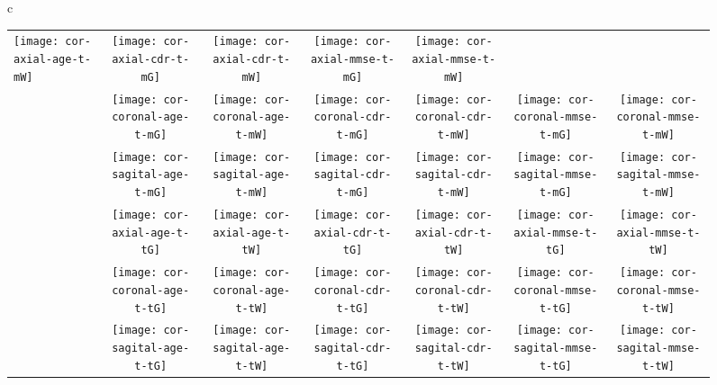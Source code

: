 \documentclass{llncs}
\begin{document}
\begin{figure}[tb]
\begin{tabular}{c}
\begin{tabular}{l|cc|cc|cc}
\texttt{[image: cor-axial-age-t-mW]} &
\texttt{[image: cor-axial-cdr-t-mG]} &
\texttt{[image: cor-axial-cdr-t-mW]} &
\texttt{[image: cor-axial-mmse-t-mG]} &
\texttt{[image: cor-axial-mmse-t-mW]} \\ 
%
        &
\texttt{[image: cor-coronal-age-t-mG]} &
\texttt{[image: cor-coronal-age-t-mW]} &
\texttt{[image: cor-coronal-cdr-t-mG]} &
\texttt{[image: cor-coronal-cdr-t-mW]} &
\texttt{[image: cor-coronal-mmse-t-mG]} &
\texttt{[image: cor-coronal-mmse-t-mW]} \\ 
%
        &
\texttt{[image: cor-sagital-age-t-mG]} &
\texttt{[image: cor-sagital-age-t-mW]} &
\texttt{[image: cor-sagital-cdr-t-mG]} &
\texttt{[image: cor-sagital-cdr-t-mW]} &
\texttt{[image: cor-sagital-mmse-t-mG]} &
\texttt{[image: cor-sagital-mmse-t-mW]} \\ \hline \hline
\parbox[t]{2mm}{}&
\texttt{[image: cor-axial-age-t-tG]} &
\texttt{[image: cor-axial-age-t-tW]} &
\texttt{[image: cor-axial-cdr-t-tG]} &
\texttt{[image: cor-axial-cdr-t-tW]} &
\texttt{[image: cor-axial-mmse-t-tG]} &
\texttt{[image: cor-axial-mmse-t-tW]} \\ 
%
        &
\texttt{[image: cor-coronal-age-t-tG]} &
\texttt{[image: cor-coronal-age-t-tW]} &
\texttt{[image: cor-coronal-cdr-t-tG]} &
\texttt{[image: cor-coronal-cdr-t-tW]} &
\texttt{[image: cor-coronal-mmse-t-tG]} &
\texttt{[image: cor-coronal-mmse-t-tW]} \\ 
%
        &
\texttt{[image: cor-sagital-age-t-tG]} &
\texttt{[image: cor-sagital-age-t-tW]} &
\texttt{[image: cor-sagital-cdr-t-tG]} &
\texttt{[image: cor-sagital-cdr-t-tW]} &
\texttt{[image: cor-sagital-mmse-t-tG]} &
\texttt{[image: cor-sagital-mmse-t-tW]} \\ \hline \hline

\end{tabular}
\end{tabular}
\end{figure}
\end{document}
